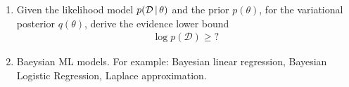 \documentclass{article}
\begin{document}
\begin{question}
\begin{enumerate}
    \item Given the likelihood model $p(\mathcal{D}\,|\,\theta)$ and the prior $p(\theta)$, for the variational posterior $q(\theta)$, derive the evidence lower bound
    \begin{align*}
        \log p(\mathcal{D}) \geq ?
    \end{align*}
    \item Baeysian ML models. For example: Bayesian linear regression, Bayesian Logistic Regression, Laplace approximation.
\end{enumerate}
\end{question}
\end{document}
